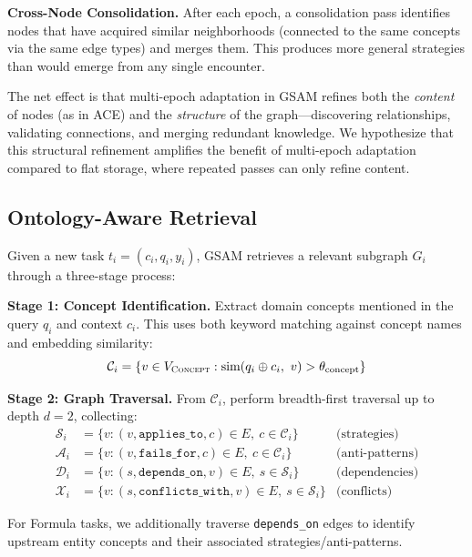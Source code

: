 \documentclass[12pt,a4paper]{article}
\begin{document}
\textbf{Cross-Node Consolidation.} After each epoch, a consolidation pass identifies nodes that have acquired similar neighborhoods (connected to the same concepts via the same edge types) and merges them. This produces more general strategies than would emerge from any single encounter.

The net effect is that multi-epoch adaptation in GSAM refines both the \textit{content} of nodes (as in ACE) and the \textit{structure} of the graph---discovering relationships, validating connections, and merging redundant knowledge. We hypothesize that this structural refinement amplifies the benefit of multi-epoch adaptation compared to flat storage, where repeated passes can only refine content.


\subsection{Ontology-Aware Retrieval}
\label{sec:retrieval}

Given a new task $t_i = (c_i, q_i, y_i)$, GSAM retrieves a relevant subgraph $G_i$ through a three-stage process:

\textbf{Stage 1: Concept Identification.} Extract domain concepts mentioned in the query $q_i$ and context $c_i$. This uses both keyword matching against concept names and embedding similarity:
\begin{equation}
\mathcal{C}_i = \{v \in V_{\textsc{Concept}} : \text{sim}(q_i \oplus c_i,\ v) > \theta_{\text{concept}}\}
\end{equation}

\textbf{Stage 2: Graph Traversal.} From $\mathcal{C}_i$, perform breadth-first traversal up to depth $d = 2$, collecting:
\begin{align}
\mathcal{S}_i &= \{v : (v, \texttt{applies\_to}, c) \in E,\ c \in \mathcal{C}_i\} & \text{(strategies)} \\
\mathcal{A}_i &= \{v : (v, \texttt{fails\_for}, c) \in E,\ c \in \mathcal{C}_i\} & \text{(anti-patterns)} \\
\mathcal{D}_i &= \{v : (s, \texttt{depends\_on}, v) \in E,\ s \in \mathcal{S}_i\} & \text{(dependencies)} \\
\mathcal{X}_i &= \{v : (s, \texttt{conflicts\_with}, v) \in E,\ s \in \mathcal{S}_i\} & \text{(conflicts)}
\end{align}

For Formula tasks, we additionally traverse \texttt{depends\_on} edges to identify upstream entity concepts and their associated strategies/anti-patterns.
\end{document}

